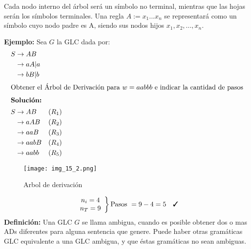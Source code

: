 Cada nodo interno del árbol será un símbolo no terminal, mientras que las hojas serán los símbolos terminales. Una regla $A:= x_1...x_n$ se representará como un símbolo cuyo nodo padre es A, siendo sus nodos hijos $x_1,x_2,...,x_n$.

\textbf{Ejemplo: }Sea $G$ la GLC dada por:
\begin{align*}
S	&\rightarrow AB		& \\
	&\rightarrow aA|a	& \\
	&\rightarrow bB|b	& \\
\intertext{Obtener el Árbol de Derivación para $w=aabbb$ e indicar la cantidad de pasos}
\intertext{\textbf{Solución: }}
S	&\rightarrow AB		&(R_1)	\\
	&\rightarrow aAB	&(R_2)	\\
	&\rightarrow aaB	&(R_3)	\\
	&\rightarrow aabB	&(R_4)	\\
	&\rightarrow aabb	&(R_5)	\\
\end{align*}
\begin{figure}[h!]
\centering
\texttt{[image: img\_15\_2.png]}
\caption{Arbol de derivación}\label{img_15_2}
\end{figure}
\begin{align*}
\left. \begin{array}{c}
n_i=4	\\
n_T=9
\end{array}\right \} \mbox{Pasos }=9-4=5 \quad \cmark
\end{align*}
\textbf{Definición: }Una GLC $G$ se llama ambigua, cuando es posible obtener dos o mas ADs diferentes para alguna sentencia que genere. Puede haber otras gramáticas GLC equivalente a una GLC ambigua, y que éstas gramáticas no sean ambiguas.

